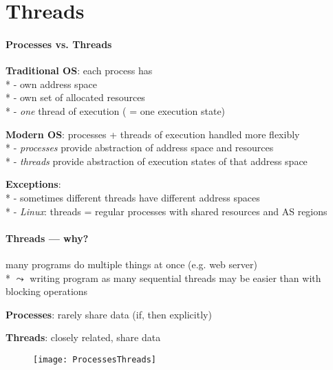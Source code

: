 \section{Threads}

\paragraph{Processes vs. Threads}
\begin{items}
  \item \textbf{Traditional OS}: each process has \\*
    - own address space \\*
    - own set of allocated resources \\*
    - \emph{one} thread of execution ( = one execution state)
  \item \textbf{Modern OS}: processes + threads of execution handled more flexibly \\*
    - \emph{processes} provide abstraction of address space and resources \\*
    - \emph{threads} provide abstraction of execution states of that address space
  \item \textbf{Exceptions}: \\*
    - sometimes different threads have different address spaces \\*
    - \emph{Linux}: threads = regular processes with shared resources and AS regions
\end{items}

\paragraph{Threads --- why?}
\begin{items}
  \item many programs do multiple things at once (e.g. web server) \\*
    \( \leadsto \) writing program as many sequential threads may be easier than with blocking operations
  \item \textbf{Processes}: rarely share data (if, then explicitly)
  \item \textbf{Threads}: closely related, share data
\end{items}
\begin{figure}[H]\centering\label{ProcessesThreads}\texttt{[image: ProcessesThreads]}\end{figure}

